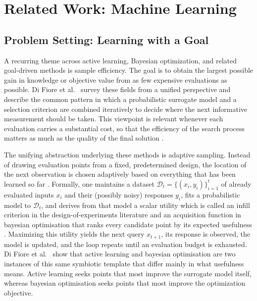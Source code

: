 \section{Related Work: Machine Learning}

\subsection{Problem Setting: Learning with a Goal}
A recurring theme across active learning, Bayesian optimization, and related goal-driven methods is sample efficiency. The goal is to obtain the largest possible gain in knowledge or objective value from as few expensive evaluations as possible. Di Fiore et al.~\cite{di2024active} survey these fields from a unified perspective and describe the common pattern in which a probabilistic surrogate model and a selection criterion are combined iteratively to decide where the next informative measurement should be taken. This viewpoint is relevant whenever each evaluation carries a substantial cost, so that the efficiency of the search process matters as much as the quality of the final solution \cite{di2024active}.

The unifying abstraction underlying these methods is adaptive sampling. Instead of drawing evaluation points from a fixed, predetermined design, the location of the next observation is chosen adaptively based on everything that has been learned so far \cite{di2024active}. Formally, one maintains a dataset $\mathcal{D}_t = \{(x_i, y_i)\}_{i=1}^{t}$ of already evaluated inputs $x_i$ and their (possibly noisy) responses $y_i$, fits a probabilistic model to $\mathcal{D}_t$, and derives from that model a scalar utility which is called an infill criterion in the design-of-experiments literature and an acquisition function in bayesian optimisation that ranks every candidate point by its expected usefulness \cite{di2024active}. Maximizing this utility yields the next query $x_{t+1}$, its response is observed, the model is updated, and the loop repeats until an evaluation budget is exhausted. Di Fiore et al.~\cite{di2024active} show that active learning and bayesian optimisation are two instances of this same symbiotic template that differ mainly in what usefulness means. Active learning seeks points that most improve the surrogate model itself, whereas bayesian optimisation seeks points that most improve the optimization objective.

